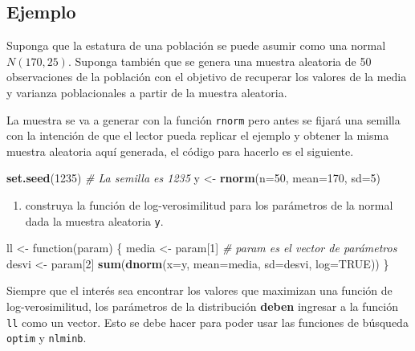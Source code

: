 \documentclass[10pt,]{krantz}
\makeatletter
\newenvironment{Shaded}{\begin{snugshade}}{\end{snugshade}}
\newcommand{\KeywordTok}[1]{\textcolor[rgb]{0.13,0.29,0.53}{\textbf{{#1}}}}
\newcommand{\DataTypeTok}[1]{\textcolor[rgb]{0.13,0.29,0.53}{{#1}}}
\newcommand{\DecValTok}[1]{\textcolor[rgb]{0.00,0.00,0.81}{{#1}}}
\newcommand{\StringTok}[1]{\textcolor[rgb]{0.31,0.60,0.02}{{#1}}}
\newcommand{\CommentTok}[1]{\textcolor[rgb]{0.56,0.35,0.01}{\textit{{#1}}}}
\newcommand{\OtherTok}[1]{\textcolor[rgb]{0.56,0.35,0.01}{{#1}}}
\newcommand{\NormalTok}[1]{{#1}}
\providecommand{\tightlist}{%
  \setlength{\itemsep}{0pt}\setlength{\parskip}{0pt}}
\newenvironment{kframe}{%
\medskip{}
\setlength{\fboxsep}{.8em}
 \def\at@end@of@kframe{}%
 \ifinner\ifhmode%
  \def\at@end@of@kframe{\end{minipage}}%
  \begin{minipage}{\columnwidth}%
 \fi\fi%
 \def\FrameCommand##1{\hskip\@totalleftmargin \hskip-\fboxsep
 \colorbox{shadecolor}{##1}\hskip-\fboxsep
     \hskip-\linewidth \hskip-\@totalleftmargin \hskip\columnwidth}%
 \MakeFramed {\advance\hsize-\width
   \@totalleftmargin\z@ \linewidth\hsize
   \@setminipage}}%
 {\par\unskip\endMakeFramed%
 \at@end@of@kframe}
\renewenvironment{Shaded}{\begin{kframe}}{\end{kframe}}
\let\BeginKnitrBlock\begin \let\EndKnitrBlock\end
\makeatother
\begin{document}
\subsection*{Ejemplo}\label{ejemplo-50}


Suponga que la estatura de una población se puede asumir como una normal
\(N(170, 25)\). Suponga también que se genera una muestra aleatoria de
50 observaciones de la población con el objetivo de recuperar los
valores de la media y varianza poblacionales a partir de la muestra
aleatoria.

La muestra se va a generar con la función \texttt{rnorm} pero antes se
fijará una semilla con la intención de que el lector pueda replicar el
ejemplo y obtener la misma muestra aleatoria aquí generada, el código
para hacerlo es el siguiente.

\begin{Shaded}
\begin{Highlighting}[]
\KeywordTok{set.seed}\NormalTok{(}\DecValTok{1235}\NormalTok{)  }\CommentTok{# La semilla es 1235}
\NormalTok{y <-}\StringTok{ }\KeywordTok{rnorm}\NormalTok{(}\DataTypeTok{n=}\DecValTok{50}\NormalTok{, }\DataTypeTok{mean=}\DecValTok{170}\NormalTok{, }\DataTypeTok{sd=}\DecValTok{5}\NormalTok{)}
\end{Highlighting}
\end{Shaded}

\begin{enumerate}
\def\labelenumi{\arabic{enumi})}
\tightlist
\item
  construya la función de log-verosimilitud para los parámetros de la
  normal dada la muestra aleatoria \texttt{y}.
\end{enumerate}

\begin{Shaded}
\begin{Highlighting}[]
\NormalTok{ll <-}\StringTok{ }\NormalTok{function(param) \{}
  \NormalTok{media <-}\StringTok{ }\NormalTok{param[}\DecValTok{1}\NormalTok{]  }\CommentTok{# param es el vector de parámetros}
  \NormalTok{desvi <-}\StringTok{ }\NormalTok{param[}\DecValTok{2}\NormalTok{] }
  \KeywordTok{sum}\NormalTok{(}\KeywordTok{dnorm}\NormalTok{(}\DataTypeTok{x=}\NormalTok{y, }\DataTypeTok{mean=}\NormalTok{media, }\DataTypeTok{sd=}\NormalTok{desvi, }\DataTypeTok{log=}\OtherTok{TRUE}\NormalTok{))}
\NormalTok{\}}
\end{Highlighting}
\end{Shaded}

\BeginKnitrBlock{rmdwarning}
Siempre que el interés sea encontrar los valores que maximizan una
función de log-verosimilitud, los parámetros de la distribución
\textbf{deben} ingresar a la función \texttt{ll} como un vector. Esto se
debe hacer para poder usar las funciones de búsqueda \texttt{optim} y
\texttt{nlminb}.
\EndKnitrBlock{rmdwarning}
\end{document}

